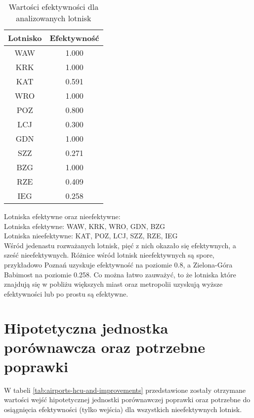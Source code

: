 \documentclass[a4paper,12pt]{article}
\begin{document}
\begin{table}[H]
    \centering
    \begin{tabular}{c|c}
    \hline
         Lotnisko & Efektywność  \\ \hline
         WAW & 1.000 \\
         KRK & 1.000 \\
         KAT & 0.591 \\
         WRO & 1.000 \\
         POZ & 0.800 \\
         LCJ & 0.300 \\
         GDN & 1.000 \\
         SZZ & 0.271 \\
         BZG & 1.000 \\
         RZE & 0.409 \\
         IEG & 0.258 \\   
    \hline
    \end{tabular}
    \caption{Wartości efektywności dla analizowanych lotnisk}
    \label{tab:airports-efficiency}
\end{table}

\noindent Lotniska efektywne oraz nieefektywne: \\
Lotniska efektywne: WAW, KRK, WRO, GDN, BZG \\
Lotniska nieefektywne: KAT, POZ, LCJ, SZZ, RZE, IEG \\
Wśród jedenastu rozważanych lotnisk, pięć z nich okazało się efektywnych, a sześć nieefektywnych.
Różnice wśród lotnisk nieefektywnych są spore, przykładowo Poznań uzyskuje efektywność na poziomie 0.8, a Zielona-Góra Babimost na poziomie 0.258.
Co można łatwo zauważyć, to że lotniska które znajdują się w pobliżu większych miast oraz metropolii uzyskują wyższe efektywności lub po prostu są efektywne.


\section{Hipotetyczna jednostka porównawcza oraz potrzebne poprawki}

W tabeli \ref{tab:airports-hcu-and-improvements} przedstawione zostały otrzymane wartości wejść hipotetycznej jednostki porównawczej poprawki oraz potrzebne do osiągnięcia efektywności (tylko wejścia) dla wszystkich nieefektywnych lotnisk.
\end{document}
